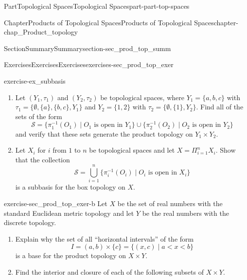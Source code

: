 \documentclass[oneside,10pt,]{book}
\numberwithin{equation}{chapter}
\newcommand{\CS}{\mathcal{S}}
\newcommand{\lt}{<}
\begin{document}
\begin{partptx}{Part}{Topological Spaces}{}{Topological Spaces}{}{}{part-part-top-spaces}
\begin{chapterptx}{Chapter}{Products of Topological Spaces}{}{Products of Topological Spaces}{}{}{chapter-chap_Product_topology}
\begin{sectionptx}{Section}{Summary}{}{Summary}{}{}{section-sec_prod_top_summ}
\begin{itemize}[label=\textbullet]
\end{itemize}
%
\end{sectionptx}
%
%
\typeout{************************************************}
\typeout{************************************************}
%
\begin{exercises-section}{Exercises}{Exercises}{}{Exercises}{}{}{exercises-sec_prod_top_exer}
\begin{divisionexercise}{1}{}{}{exercise-ex_subbasis}%
\begin{enumerate}[font=\bfseries,label=(\alph*),ref=\alph*]%
\item{}Let \((Y_1, \tau_1)\) and \((Y_2, \tau_2)\) be topological spaces, where \(Y_1 = \{a,b,c\}\) with \(\tau_1 = \{\emptyset, \{a\}, \{b,c\}, Y_1\}\) and \(Y_2 = \{1,2\}\) with \(\tau_2 = \{\emptyset, \{1\}, Y_2\}\). Find all of the sets of the form%
\begin{equation*}
\CS = \{\pi_1^{-1}(O_1) \mid O_1 \text{ is open in }  Y_1\} \cup \{\pi_2^{-1}(O_2) \mid O_2 \text{ is open in }  Y_2\}
\end{equation*}
and verify that these sets generate the product topology on \(Y_1 \times Y_2\).%
\item{}Let \(X_{i}\) for \(i\) from \(1\) to \(n\) be topological spaces and let \(X = \Pi_{i=1}^n X_i\). Show that the collection%
\begin{equation*}
\CS = \bigcup_{i=1}^n \{\pi_i^{-1}(O_i) \mid O_i \text{ is open in }  X_i\}
\end{equation*}
is a subbasis for the box topology on \(X\).%
\end{enumerate}%
\end{divisionexercise}%
\begin{divisionexercise}{2}{}{}{exercise-sec_prod_top_exer-b}%
Let \(X\) be the set of real numbers with the standard Euclidean metric topology and let \(Y\) be the real numbers with the discrete topology.%
\begin{enumerate}[font=\bfseries,label=(\alph*),ref=\alph*]%
\item{}Explain why the set of all ``horizontal intervals'' of the form%
\begin{equation*}
I= (a,b) \times \{c\} = \{(x,c) \mid a \lt  x \lt  b\}
\end{equation*}
is a base for the product topology on \(X \times Y\).%
\item{}Find the interior and closure of each of the following subsets of \(X \times Y\).%
\begin{enumerate}[font=\bfseries,label=(\roman*),ref=\theenumi.\roman*]%

\end{enumerate}
\end{enumerate}
\end{divisionexercise}
\end{exercises-section}
\end{chapterptx}
\end{partptx}
\end{document}
